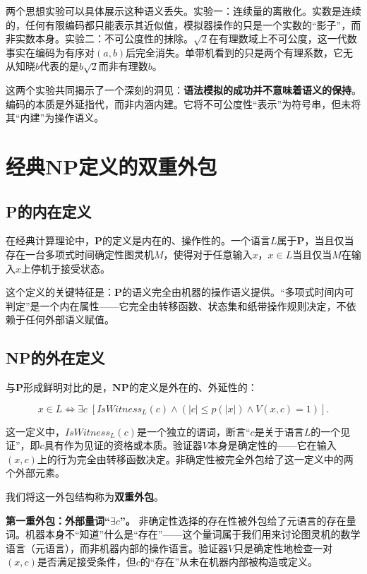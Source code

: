 \documentclass{ctexart}
\begin{document}
	两个思想实验可以具体展示这种语义丢失。实验一：连续量的离散化。实数是连续的，任何有限编码都只能表示其近似值，模拟器操作的只是一个实数的``影子''，而非实数本身。实验二：不可公度性的抹除。$\sqrt{2}$在有理数域上不可公度，这一代数事实在编码为有序对$(a, b)$后完全消失。单带机看到的只是两个有理系数，它无从知晓$b$代表的是$b\sqrt{2}$而非有理数$b$。
	
	这两个实验共同揭示了一个深刻的洞见：\textbf{语法模拟的成功并不意味着语义的保持}。编码的本质是外延指代，而非内涵内建。它将不可公度性``表示''为符号串，但未将其``内建''为操作语义。
	
	\section{经典NP定义的双重外包}
	
	\subsection{P的内在定义}
	
	在经典计算理论中，$\mathbf{P}$的定义是内在的、操作性的。一个语言$L$属于$\mathbf{P}$，当且仅当存在一台多项式时间确定性图灵机$M$，使得对于任意输入$x$，$x \in L$当且仅当$M$在输入$x$上停机于接受状态。
	
	这个定义的关键特征是：$\mathbf{P}$的语义完全由机器的操作语义提供。``多项式时间内可判定''是一个内在属性——它完全由转移函数、状态集和纸带操作规则决定，不依赖于任何外部语义赋值。
	
	\subsection{NP的外在定义}
	
	与$\mathbf{P}$形成鲜明对比的是，$\mathbf{NP}$的定义是外在的、外延性的：
	
	\[
	x \in L \iff \exists c \; [IsWitness_L(c) \land (|c| \le p(|x|) \land V(x, c) = 1)].
	\]
	
	这一定义中，$IsWitness_L(c)$是一个独立的谓词，断言``$c$是关于语言$L$的一个见证''，即$c$具有作为见证的资格或本质。验证器$V$本身是确定性的——它在输入$(x, c)$上的行为完全由转移函数决定。非确定性被完全外包给了这一定义中的两个外部元素。
	
	我们将这一外包结构称为\textbf{双重外包}。
	
	\textbf{第一重外包：外部量词``$\exists c$''。} 非确定性选择的存在性被外包给了元语言的存在量词。机器本身不``知道''什么是``存在''——这个量词属于我们用来讨论图灵机的数学语言（元语言），而非机器内部的操作语言。验证器$V$只是确定性地检查一对$(x, c)$是否满足接受条件，但$c$的``存在''从未在机器内部被构造或定义。
	
\end{document}
